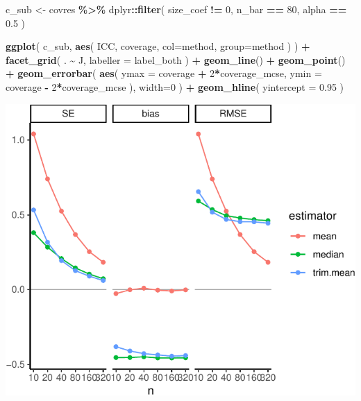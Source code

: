 \documentclass[
]{book}
\newenvironment{Shaded}{\begin{snugshade}}{\end{snugshade}}
\newcommand{\AttributeTok}[1]{\textcolor[rgb]{0.13,0.29,0.53}{#1}}
\newcommand{\DecValTok}[1]{\textcolor[rgb]{0.00,0.00,0.81}{#1}}
\newcommand{\FloatTok}[1]{\textcolor[rgb]{0.00,0.00,0.81}{#1}}
\newcommand{\FunctionTok}[1]{\textcolor[rgb]{0.13,0.29,0.53}{\textbf{#1}}}
\newcommand{\NormalTok}[1]{#1}
\newcommand{\OtherTok}[1]{\textcolor[rgb]{0.56,0.35,0.01}{#1}}
\newcommand{\SpecialCharTok}[1]{\textcolor[rgb]{0.81,0.36,0.00}{\textbf{#1}}}
\begin{document}
\begin{Shaded}
\begin{Highlighting}[]
\NormalTok{c\_sub }\OtherTok{\textless{}{-}}\NormalTok{ covres }\SpecialCharTok{\%\textgreater{}\%}
\NormalTok{  dplyr}\SpecialCharTok{::}\FunctionTok{filter}\NormalTok{( size\_coef }\SpecialCharTok{!=} \DecValTok{0}\NormalTok{, n\_bar }\SpecialCharTok{==} \DecValTok{80}\NormalTok{, alpha }\SpecialCharTok{==} \FloatTok{0.5}\NormalTok{ )}

\FunctionTok{ggplot}\NormalTok{( c\_sub, }\FunctionTok{aes}\NormalTok{( ICC, coverage, }\AttributeTok{col=}\NormalTok{method, }\AttributeTok{group=}\NormalTok{method ) ) }\SpecialCharTok{+}
  \FunctionTok{facet\_grid}\NormalTok{( . }\SpecialCharTok{\textasciitilde{}}\NormalTok{ J, }\AttributeTok{labeller =}\NormalTok{ label\_both ) }\SpecialCharTok{+}
  \FunctionTok{geom\_line}\NormalTok{() }\SpecialCharTok{+}
  \FunctionTok{geom\_point}\NormalTok{() }\SpecialCharTok{+}
  \FunctionTok{geom\_errorbar}\NormalTok{( }\FunctionTok{aes}\NormalTok{( }\AttributeTok{ymax =}\NormalTok{ coverage }\SpecialCharTok{+} \DecValTok{2}\SpecialCharTok{*}\NormalTok{coverage\_mcse, }
                      \AttributeTok{ymin =}\NormalTok{ coverage }\SpecialCharTok{{-}} \DecValTok{2}\SpecialCharTok{*}\NormalTok{coverage\_mcse ), }\AttributeTok{width=}\DecValTok{0}\NormalTok{ ) }\SpecialCharTok{+}
  \FunctionTok{geom\_hline}\NormalTok{( }\AttributeTok{yintercept =} \FloatTok{0.95}\NormalTok{ )}
\end{Highlighting}
\end{Shaded}

\begin{center}\includegraphics[width=0.75\linewidth]{Designing-Simulations-in-R_files/figure-latex/unnamed-chunk-189-1} \end{center}
\end{document}
